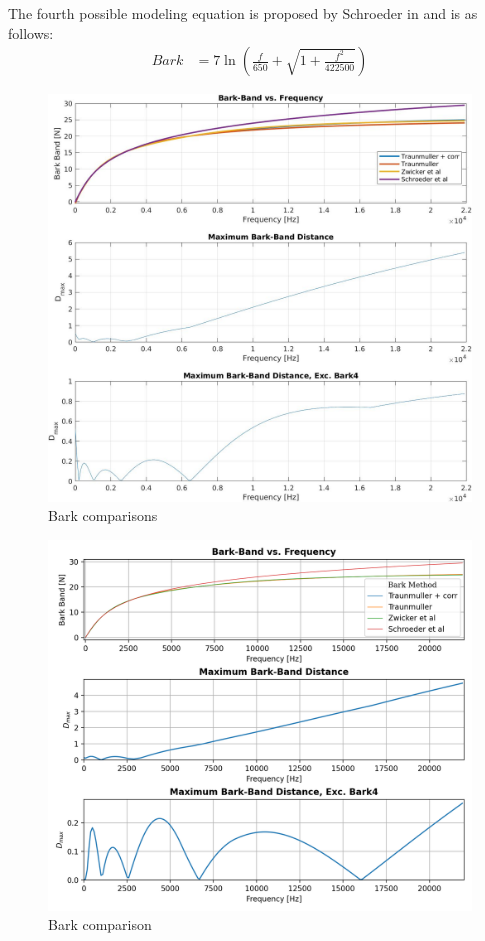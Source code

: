 The fourth possible modeling equation is proposed by
Schroeder in \cite{SchroederScale} and is as follows:
\begin{align}
    Bark & = 7\ln \left( \frac{f}{650} + \sqrt{1 + \frac{f^{2}}{422500} }  \right)
\end{align}


\begin{figure}[H]
    \centering
    \includegraphics[width=0.75\linewidth]{Experiments/images/bark_comparison}
    \caption{Bark comparisons}\label{fig:bark_comparison}
\end{figure}


\begin{figure}[H]
    \centering
    \includegraphics[width=0.75\linewidth]{Experiments/images/bark_comparison2}
    \caption{Bark comparison}\label{fig:wer_23}
\end{figure}




